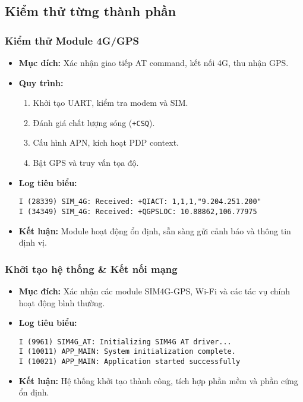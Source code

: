 \subsection{Kiểm thử từng thành phần}
\begin{frame}[t,fragile]
\frametitle{Kiểm thử Module 4G/GPS}
\begin{itemize}
    \item \textbf{Mục đích:} Xác nhận giao tiếp AT command, kết nối 4G, thu nhận GPS.
    \item \textbf{Quy trình:}
    \begin{enumerate}
        \item Khởi tạo UART, kiểm tra modem và SIM.
        \item Đánh giá chất lượng sóng (\texttt{+CSQ}).
        \item Cấu hình APN, kích hoạt PDP context.
        \item Bật GPS và truy vấn tọa độ.
    \end{enumerate}
    \item \textbf{Log tiêu biểu:}
    \begin{verbatim}
I (28339) SIM_4G: Received: +QIACT: 1,1,1,"9.204.251.200"
I (34349) SIM_4G: Received: +QGPSLOC: 10.88862,106.77975
    \end{verbatim}
    \item \textbf{Kết luận:} Module hoạt động ổn định, sẵn sàng gửi cảnh báo và thông tin định vị.
\end{itemize}
\end{frame}

\begin{frame}[t,fragile]
\frametitle{Khởi tạo hệ thống \& Kết nối mạng}
\begin{itemize}
    \item \textbf{Mục đích:} Xác nhận các module SIM4G-GPS, Wi-Fi và các tác vụ chính hoạt động bình thường.
    \item \textbf{Log tiêu biểu:}
    \begin{verbatim}
I (9961) SIM4G_AT: Initializing SIM4G AT driver...
I (10011) APP_MAIN: System initialization complete.
I (10021) APP_MAIN: Application started successfully
    \end{verbatim}
    \item \textbf{Kết luận:} Hệ thống khởi tạo thành công, tích hợp phần mềm và phần cứng ổn định.
\end{itemize}
\end{frame}

